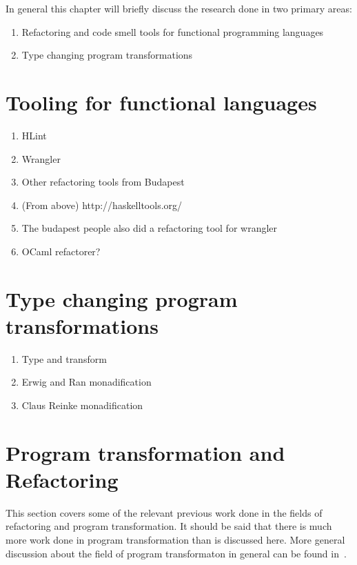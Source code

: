 In general this chapter will briefly discuss the research done in two primary areas:

\begin{enumerate}
\item Refactoring and code smell tools for functional programming languages
\item Type changing program transformations 
\end{enumerate}

\section{Tooling for functional languages}

\begin{enumerate}
\item HLint
\item Wrangler
\item Other refactoring tools from Budapest
\item (From above) http://haskelltools.org/
\item The budapest people also did a refactoring tool for wrangler
\item OCaml refactorer?
\end{enumerate}


\section{Type changing program transformations}

\begin{enumerate}
\item Type and transform
\item Erwig and Ran monadification
\item Claus Reinke monadification
\end{enumerate}


\section{Program transformation and Refactoring}

This section covers some of the relevant previous work done in the fields of refactoring and program transformation. It should be said that there is much more work done in program transformation than is discussed here. More general discussion about the field of program transformaton in general can be found in~\citep{visserSurvey,transformationIntro}.


